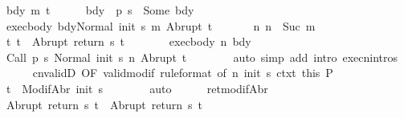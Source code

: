 \begin{isabellebody}
\ bdy\ m\ t{\isacharprime}\isanewline
\ \ \ \ \isamarkupfalse%
\ bdy{\isacharcolon}\ {\isachardoublequoteopen}{\isasymGamma}\ {\isacharparenleft}p\ s{\isacharparenright}\ {\isacharequal}\ Some\ bdy{\isachardoublequoteclose}\isanewline
\ \ \ \ \isamarkupfalse%
\ exec{\isacharunderscore}body{\isacharcolon}\ {\isachardoublequoteopen}{\isasymGamma}{\isasymturnstile}{\isasymlangle}bdy{\isacharcomma}Normal\ {\isacharparenleft}init\ s{\isacharparenright}{\isasymrangle}\ {\isacharequal}m{\isasymRightarrow}\ Abrupt\ t{\isacharprime}{\isachardoublequoteclose}\ \isanewline
\ \ \ \ \isamarkupfalse%
\ n{\isacharcolon}\ {\isachardoublequoteopen}n\ {\isacharequal}\ Suc\ m{\isachardoublequoteclose}\isanewline
\ \ \ \ \isamarkupfalse%
\ t{\isacharcolon}\ {\isachardoublequoteopen}t\ {\isacharequal}\ Abrupt\ {\isacharparenleft}return\ s\ t{\isacharprime}{\isacharparenright}{\isachardoublequoteclose}\isanewline
\ \ \ \ \isamarkupfalse%
\ \isamarkupfalse%
\ exec{\isacharunderscore}body\ n\ bdy\isanewline
\ \ \ \ \isamarkupfalse%
\ {\isachardoublequoteopen}{\isasymGamma}{\isasymturnstile}{\isasymlangle}Call\ {\isacharparenleft}p\ s{\isacharparenright}\ {\isacharcomma}Normal\ {\isacharparenleft}init\ s{\isacharparenright}{\isasymrangle}\ {\isacharequal}n{\isasymRightarrow}\ Abrupt\ t{\isacharprime}{\isachardoublequoteclose}\isanewline
\ \ \ \ \ \ \isamarkupfalse%
\ {\isacharparenleft}auto\ simp\ add{\isacharcolon}\ intro{\isacharcolon}\ execn{\isachardot}intros{\isacharparenright}\isanewline
\ \ \ \ \isamarkupfalse%
\ cnvalidD\ {\isacharbrackleft}OF\ valid{\isacharunderscore}modif{\isacharprime}\ {\isacharbrackleft}rule{\isacharunderscore}format{\isacharcomma}\ of\ n\ {\isachardoublequoteopen}init\ s{\isachardoublequoteclose}{\isacharbrackright}\ ctxt{\isacharprime}\ this{\isacharbrackright}\ P\isanewline
\ \ \ \ \isamarkupfalse%
\ {\isachardoublequoteopen}t{\isacharprime}\ {\isasymin}\ ModifAbr\ {\isacharparenleft}init\ s{\isacharparenright}{\isachardoublequoteclose}\isanewline
\ \ \ \ \ \ \isamarkupfalse%
\ auto\isanewline
\ \ \ \ \isamarkupfalse%
\ ret{\isacharunderscore}modifAbr\ \isamarkupfalse%
\ {\isachardoublequoteopen}Abrupt\ {\isacharparenleft}return\ s\ t{\isacharprime}{\isacharparenright}\ {\isacharequal}\ Abrupt\ {\isacharparenleft}return{\isacharprime}\ s\ t{\isacharprime}{\isacharparenright}{\isachardoublequoteclose}\isanewline
\ \ \ \ \ \ \isamarkupfalse%

\end{isabellebody}
